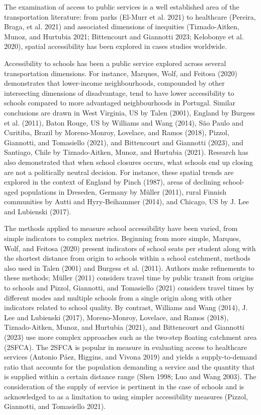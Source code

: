 \documentclass[
default
]{sn-jnl}
\begin{document}
The examination of access to public services is a well established area
of the transportation literature: from parks (El-Murr et al. 2021) to
healthcare (Pereira, Braga, et al. 2021) and associated dimensions of
inequities (Tiznado-Aitken, Munoz, and Hurtubia 2021; Bittencourt and
Giannotti 2023; Kelobonye et al. 2020), spatial accessibility has been
explored in cases studies worldwide.

Accessibility to schools has been a public service explored across
several transportation dimensions. For instance, Marques, Wolf, and
Feitosa (2020) demonstrates that lower-income neighbourhoods, compounded
by other intersecting dimensions of disadvantage, tend to have lower
accessibility to schools compared to more advantaged neighbourhoods in
Portugal. Similar conclusions are drawn in West Virginia, US by Talen
(2001), England by Burgess et al. (2011), Baton Rouge, US by Williams
and Wang (2014), São Paulo and Curitiba, Brazil by Moreno-Monroy,
Lovelace, and Ramos (2018), Pizzol, Giannotti, and Tomasiello (2021),
and Bittencourt and Giannotti (2023), and Santiago, Chile by
Tiznado-Aitken, Munoz, and Hurtubia (2021). Research has also
demonstrated that when school closures occurs, what schools end up
closing are not a politically neutral decision. For instance, these
spatial trends are explored in the context of England by Pinch (1987),
areas of declining school-aged populations in Dreseden, Germany by
Müller (2011), rural Finnish communities by Autti and Hyry-Beihammer
(2014), and Chicago, US by J. Lee and Lubienski (2017).

The methods applied to measure school accessibility have been varied,
from simple indicators to complex metrics. Beginning from more simple,
Marques, Wolf, and Feitosa (2020) present indicators of school seats per
student along with the shortest distance from origin to schools within a
school catchment, methods also used in Talen (2001) and Burgess et al.
(2011). Authors make refinements to these methods; Müller (2011)
considers travel time by public transit from origins to schools and
Pizzol, Giannotti, and Tomasiello (2021) considers travel times by
different modes and multiple schools from a single origin along with
other indicators related to school quality. By contrast, Williams and
Wang (2014), J. Lee and Lubienski (2017), Moreno-Monroy, Lovelace, and
Ramos (2018), Tiznado-Aitken, Munoz, and Hurtubia (2021), and
Bittencourt and Giannotti (2023) use more complex approaches such as the
two-step floating catchment area (2SFCA). The 2SFCA is popular in
measure in evaluating access to healthcare services (Antonio Páez,
Higgins, and Vivona 2019) and yields a supply-to-demand ratio that
accounts for the population demanding a service and the quantity that is
supplied within a certain distance range (Shen 1998; Luo and Wang 2003).
The consideration of the supply of service is pertinent in the case of
schools and is acknowledged to as a limitation to using simpler
accessibility measures (Pizzol, Giannotti, and Tomasiello 2021).
\end{document}
